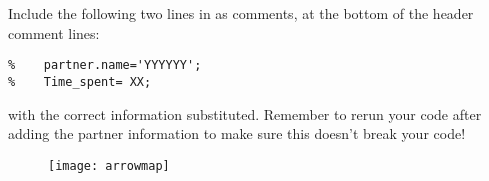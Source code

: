 \documentclass[letterpaper,12pt]{article}
\begin{document}
Include the following two lines in  as comments, at the bottom of the header comment lines:
\vspace{-15pt}
\begin{lstlisting}
%    partner.name='YYYYYY';
%    Time_spent= XX;
\end{lstlisting}
\vspace{-15pt}
with the correct information substituted. Remember to rerun your code after adding the partner information to make sure this doesn't break your code!
 
 \vspace{2in}
\begin{figure}[h] 
\begin{center}
\texttt{[image: arrowmap]}
\end{center}
\end{figure}
\end{document}
